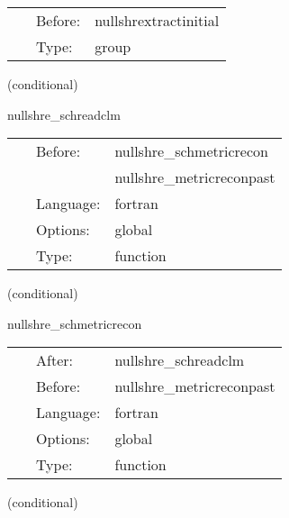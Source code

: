  \begin{tabular*}{160mm}{cll} 
~ & Before:  & nullshrextractinitial \\ 
~ & Type:  & group \\ 
\end{tabular*} 


\vspace{5mm}

   (conditional) 

\hspace{5mm} nullshre\_schreadclm 

\hspace{5mm}{\it computes the schwarzchild spherical harmonic coefficients } 


\hspace{5mm}

 \begin{tabular*}{160mm}{cll} 
~ & Before:  & nullshre\_schmetricrecon \\ 
~& ~ &nullshre\_metricreconpast\\ 
~ & Language:  & fortran \\ 
~ & Options:  & global \\ 
~ & Type:  & function \\ 
\end{tabular*} 


\vspace{5mm}

   (conditional) 

\hspace{5mm} nullshre\_schmetricrecon 

\hspace{5mm}{\it schwarzchild metric and its derivatives on the sphere } 


\hspace{5mm}

 \begin{tabular*}{160mm}{cll} 
~ & After:  & nullshre\_schreadclm \\ 
~ & Before:  & nullshre\_metricreconpast \\ 
~ & Language:  & fortran \\ 
~ & Options:  & global \\ 
~ & Type:  & function \\ 
\end{tabular*} 


\vspace{5mm}

   (conditional) 

